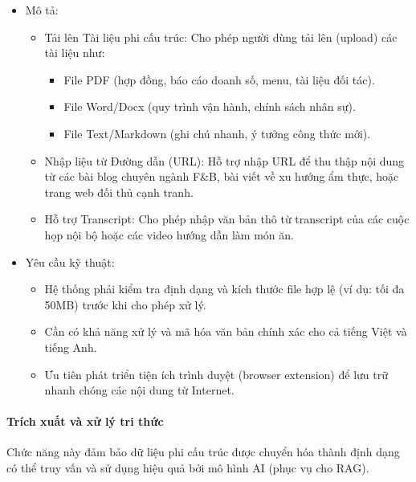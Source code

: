 \begin{itemize}
\item
  Mô tả:

  \begin{itemize}
  \item
    Tải lên Tài liệu phi cấu trúc: Cho phép người dùng tải lên (upload)
    các tài liệu như:

    \begin{itemize}
    \item
      File PDF (hợp đồng, báo cáo doanh số, menu, tài liệu đối tác).
    \item
      File Word/Docx (quy trình vận hành, chính sách nhân sự).
    \item
      File Text/Markdown (ghi chú nhanh, ý tưởng công thức mới).
    \end{itemize}
  \item
    Nhập liệu từ Đường dẫn (URL): Hỗ trợ nhập URL để thu thập nội dung
    từ các bài blog chuyên ngành F\&B, bài viết về xu hướng ẩm thực,
    hoặc trang web đối thủ cạnh tranh.
  \item
    Hỗ trợ Transcript: Cho phép nhập văn bản thô từ transcript của các
    cuộc họp nội bộ hoặc các video hướng dẫn làm món ăn.
  \end{itemize}
\item
  Yêu cầu kỹ thuật:

  \begin{itemize}
  \item
    Hệ thống phải kiểm tra định dạng và kích thước file hợp lệ (ví dụ:
    tối đa 50MB) trước khi cho phép xử lý.
  \item
    Cần có khả năng xử lý và mã hóa văn bản chính xác cho cả tiếng Việt
    và tiếng Anh.
  \item
    Ưu tiên phát triển tiện ích trình duyệt (browser extension) để lưu
    trữ nhanh chóng các nội dung từ Internet.
  \end{itemize}
\end{itemize}

\paragraph{Trích xuất và xử lý tri
thức}\label{truxedch-xuux1ea5t-vuxe0-xux1eed-luxfd-tri-thux1ee9c}

Chức năng này đảm bảo dữ liệu phi cấu trúc được chuyển hóa thành định
dạng có thể truy vấn và sử dụng hiệu quả bởi mô hình AI (phục vụ cho
RAG).

